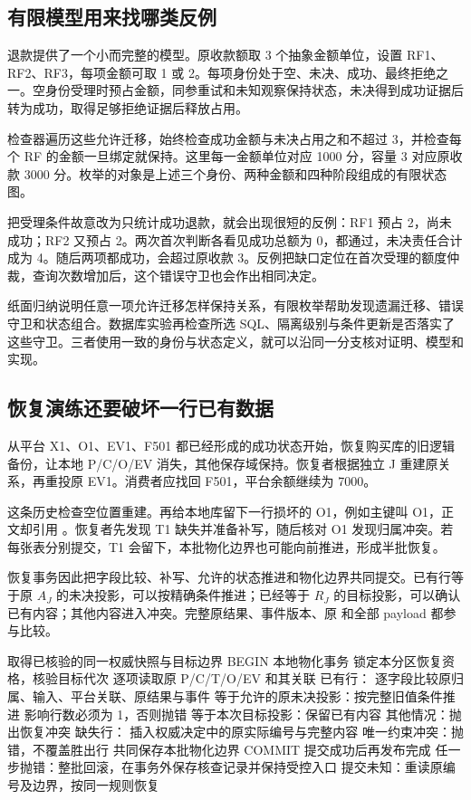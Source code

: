 \subsection*{有限模型用来找哪类反例}

退款提供了一个小而完整的模型。原收款额取 3 个抽象金额单位，设置 RF1、RF2、RF3，每项金额可取 1 或 2。每项身份处于空、未决、成功、最终拒绝之一。空身份受理时预占金额，同参重试和未知观察保持状态，未决得到成功证据后转为成功，取得足够拒绝证据后释放占用。

检查器遍历这些允许迁移，始终检查成功金额与未决占用之和不超过 3，并检查每个 RF 的金额一旦绑定就保持。这里每一金额单位对应 1000 分，容量 3 对应原收款 3000 分。枚举的对象是上述三个身份、两种金额和四种阶段组成的有限状态图。


把受理条件故意改为只统计成功退款，就会出现很短的反例：RF1 预占 2，尚未成功；RF2 又预占 2。两次首次判断各看见成功总额为 0，都通过，未决责任合计成为 4。随后两项都成功，会超过原收款 3。反例把缺口定位在首次受理的额度仲裁，查询次数增加后，这个错误守卫也会作出相同决定。

纸面归纳说明任意一项允许迁移怎样保持关系，有限枚举帮助发现遗漏迁移、错误守卫和状态组合。数据库实验再检查所选 SQL、隔离级别与条件更新是否落实了这些守卫。三者使用一致的身份与状态定义，就可以沿同一分支核对证明、模型和实现。

\subsection*{恢复演练还要破坏一行已有数据}

从平台 X1、O1、EV1、F501 都已经形成的成功状态开始，恢复购买库的旧逻辑备份，让本地 P/C/O/EV 消失，其他保存域保持。恢复者根据独立 J 重建原关系，再重投原 EV1。消费者应找回 F501，平台余额继续为 7000。

这条历史检查空位置重建。再给本地库留下一行损坏的 O1，例如主键叫 O1，正文却引用 。恢复者先发现 T1 缺失并准备补写，随后核对 O1 发现归属冲突。若每张表分别提交，T1 会留下，本批物化边界也可能向前推进，形成半批恢复。

恢复事务因此把字段比较、补写、允许的状态推进和物化边界共同提交。已有行等于原 $A_J$ 的未决投影，可以按精确条件推进；已经等于 $R_J$ 的目标投影，可以确认已有内容；其他内容进入冲突。完整原结果、事件版本、原  和全部 payload 都参与比较。

\begin{BookCode}
取得已核验的同一权威快照与目标边界
BEGIN 本地物化事务
锁定本分区恢复资格，核验目标代次
逐项读取原 P/C/T/O/EV 和其关联
已有行：
    逐字段比较原归属、输入、平台关联、原结果与事件
    等于允许的原未决投影：按完整旧值条件推进
        影响行数必须为 1，否则抛错
    等于本次目标投影：保留已有内容
    其他情况：抛出恢复冲突
缺失行：
    插入权威决定中的原实际编号与完整内容
    唯一约束冲突：抛错，不覆盖胜出行
共同保存本批物化边界
COMMIT
提交成功后再发布完成
任一步抛错：整批回滚，在事务外保存核查记录并保持受控入口
提交未知：重读原编号及边界，按同一规则恢复
\end{BookCode}

